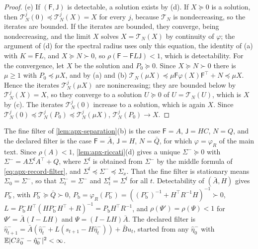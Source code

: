 \begin{proof}
(e) If $(\mathsf F,\mathsf J)$ is detectable, a solution exists by (d). If $X\succeq0$ is a solution, then $\mathcal T_N^j(0)\preceq\mathcal T_N^j(X)=X$ for every $j$, because $\mathcal T_N$ is nondecreasing, so the iterates are bounded. If the iterates are bounded, they converge, being nondecreasing, and the limit $X$ solves $X=\mathcal T_N(X)$ by continuity of $\varphi$; the argument of (d) for the spectral radius uses only this equation, the identity of (a) with $K=\mathsf FL$, and $X\succeq N\succ0$, so $\rho(\mathsf F-\mathsf FL\mathsf J)<1$, which is detectability. For the convergence, let $X$ be the solution and $P_0\succeq0$. Since $X\succeq N\succ0$ there is $\mu\ge1$ with $P_0\preceq\mu X$, and by (a) and (b) $\mathcal T_N(\mu X)\preceq\mu\mathsf F\varphi(X)\mathsf F^\top+N\preceq\mu X$. Hence the iterates $\mathcal T_N^j(\mu X)$ are nonincreasing; they are bounded below by $\mathcal T_N^j(X)=X$, so they converge to a solution $U\succeq0$ of $U=\mathcal T_N(U)$, which is $X$ by (c). The iterates $\mathcal T_N^j(0)$ increase to a solution, which is again $X$. Since $\mathcal T_N^j(0)\preceq\mathcal T_N^j(P_0)\preceq\mathcal T_N^j(\mu X)$, $\mathcal T_N^j(P_0)\to X$.
\end{proof}

The fine filter of \cref{lem:apx-separation}(b) is the case $\mathsf F=A$, $\mathsf J=HC$, $N=Q$, and the declared filter is the case $\mathsf F=\bar A$, $\mathsf J=H$, $N=\bar Q$, for which $\varphi=\varphi_R$ of the main text. Since $\rho(A)<1$, \cref{lem:apx-riccati}(d) gives a unique $\Sigma^-\succeq0$ with $\Sigma^-=A\Sigma^{\mathrm f}A^\top+Q$, where $\Sigma^{\mathrm f}$ is obtained from $\Sigma^-$ by the middle formula of \cref{eq:apx-record-filter}, and $\Sigma^{\mathrm f}\preceq\Sigma^-\preceq\Sigma_x$. That the fine filter is stationary means $\Sigma_0=\Sigma^-$, so that $\Sigma^-_t=\Sigma^-$ and $\Sigma^{\mathrm f}_t=\Sigma^{\mathrm f}$ for all $t$. Detectability of $(\bar A,H)$ gives $P^-_{\mathrm b}$, with $P^-_{\mathrm b}\succeq\bar Q\succ0$, $P_{\mathrm b}=\varphi_R(P^-_{\mathrm b})=((P^-_{\mathrm b})^{-1}+H^\top R^{-1}H)^{-1}\succ0$, $L=P^-_{\mathrm b}H^\top(HP^-_{\mathrm b}H^\top+R)^{-1}=P_{\mathrm b}H^\top R^{-1}$, and $\rho(\Psi')=\rho(\Psi)<1$ for $\Psi'=\bar A(I-LH)$ and $\Psi=(I-LH)\bar A$. The declared filter is $\hat\eta^-_{t+1}=\bar A(\hat\eta^-_t+L(s_{t+1}-H\hat\eta^-_t))+\bar Bu_t$, started from any $\hat\eta^-_0$ with $\mathbb{E}\lvert C\hat x^-_0-\hat\eta^-_0\rvert^2<\infty$.

